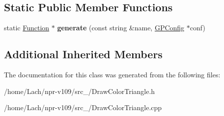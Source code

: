 \subsection*{Static Public Member Functions}
\begin{DoxyCompactItemize}
\item 
\hypertarget{classDrawColorTriangle_aafd3098c23fae0a80e8aae9297b9e490}{}\label{classDrawColorTriangle_aafd3098c23fae0a80e8aae9297b9e490} 
static \hyperlink{classFunction}{Function} $\ast$ {\bfseries generate} (const string \&name, \hyperlink{classGPConfig}{G\+P\+Config} $\ast$conf)
\end{DoxyCompactItemize}
\subsection*{Additional Inherited Members}


The documentation for this class was generated from the following files\+:\begin{DoxyCompactItemize}
\item 
/home/\+Lach/npr-\/v109/src\+\_/Draw\+Color\+Triangle.\+h\item 
/home/\+Lach/npr-\/v109/src\+\_/Draw\+Color\+Triangle.\+cpp\end{DoxyCompactItemize}
